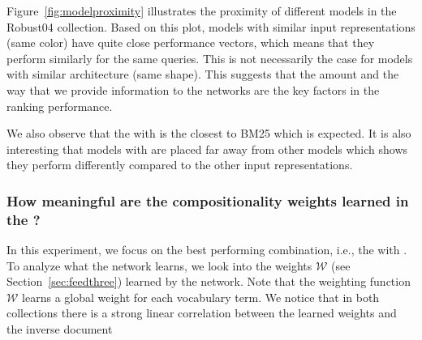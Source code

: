 Figure~\ref{fig:modelproximity} illustrates the proximity of different models in the Robust04 collection. Based on this plot, models with similar input representations (same color) have quite close performance vectors, which means that they perform similarly for the same queries. This is not necessarily the case for models with similar architecture (same shape). 
This suggests that the amount and the way that we provide information to the networks are the key factors in the ranking performance. 

We also observe that the \modelone with \feedone is the closest to BM25 which is expected. 
It is also interesting that models with \feedthree are placed far away from other models which shows they perform differently compared to the other input representations.


\subsubsection{How meaningful are the compositionality weights learned in the \feedthree?}
%
In this experiment, we focus on the best performing combination, i.e., the \modelthree with \feedthree. To analyze what the network learns, we look into the weights $\mathcal{W}$ (see Section~\ref{sec:feedthree}) learned by the network. Note that the weighting function $\mathcal{W}$ learns a global weight for each vocabulary term. We notice that in both collections there is a strong linear correlation between the learned weights and the inverse document
%
